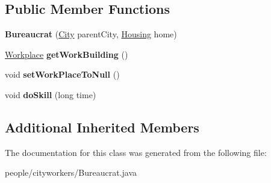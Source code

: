 \subsection*{Public Member Functions}
\begin{DoxyCompactItemize}
\item 
{\bfseries Bureaucrat} (\hyperlink{classcities_1_1_city}{City} parent\+City, \hyperlink{classbuildings_1_1housing_1_1_housing}{Housing} home)\hypertarget{classpeople_1_1cityworkers_1_1_bureaucrat_a40ca7e2f34ebd9ef021ef8105e435130}{}\label{classpeople_1_1cityworkers_1_1_bureaucrat_a40ca7e2f34ebd9ef021ef8105e435130}

\item 
\hyperlink{classbuildings_1_1workplaces_1_1_workplace}{Workplace} {\bfseries get\+Work\+Building} ()\hypertarget{classpeople_1_1cityworkers_1_1_bureaucrat_a63a7a5f5fa14834575b0ce69dc74e537}{}\label{classpeople_1_1cityworkers_1_1_bureaucrat_a63a7a5f5fa14834575b0ce69dc74e537}

\item 
void {\bfseries set\+Work\+Place\+To\+Null} ()\hypertarget{classpeople_1_1cityworkers_1_1_bureaucrat_aba0dc34499a10c77edd5114b81a6b1ed}{}\label{classpeople_1_1cityworkers_1_1_bureaucrat_aba0dc34499a10c77edd5114b81a6b1ed}

\item 
void {\bfseries do\+Skill} (long time)\hypertarget{classpeople_1_1cityworkers_1_1_bureaucrat_a09387cfd67f784844ade30b96dbe6533}{}\label{classpeople_1_1cityworkers_1_1_bureaucrat_a09387cfd67f784844ade30b96dbe6533}

\end{DoxyCompactItemize}
\subsection*{Additional Inherited Members}


The documentation for this class was generated from the following file\+:\begin{DoxyCompactItemize}
\item 
people/cityworkers/Bureaucrat.\+java\end{DoxyCompactItemize}
